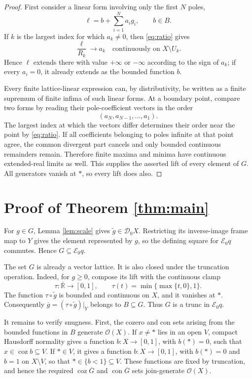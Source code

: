 \documentclass[11pt]{article}
\newcommand{\eR}{\overline{\mathbb{R}}}
\newcommand{\cO}{\mathcal{O}}
\newcommand{\E}{\mathcal{E}}
\newcommand{\D}{\mathcal{D}}
\begin{document}
\begin{proof}
First consider a linear form involving only the first \(N\) poles,
\[
 \ell=b+\sum_{i=1}^N a_i g_i,
 \qquad b\in B.
\]
If \(k\) is the largest index for which \(a_k\neq0\), then
\eqref{eq:ratio} gives
\[
 \frac{\ell}{R_k}\longrightarrow a_k
 \quad\text{continuously on }X\setminus U_k.
\]
Hence \(\ell\) extends there with value \(+\infty\) or \(-\infty\)
according to the sign of \(a_k\); if every \(a_i=0\), it already extends as
the bounded function \(b\).

Every finite lattice-linear expression can, by distributivity, be written as
a finite supremum of finite infima of such linear forms.  At a boundary point,
compare two forms by reading their pole-coefficient vectors in the order
\[
 (a_N,a_{N-1},\ldots,a_1).
\]
The largest index at which the vectors differ determines their order near the
point by \eqref{eq:ratio}.  If all coefficients belonging to poles infinite at
that point agree, the common divergent part cancels and only bounded continuous
remainders remain.  Therefore finite maxima and minima have continuous
extended-real limits as well.  This supplies the asserted lift of every
element of \(G\).  All generators vanish at \(*\), so every lift does also.
\end{proof}

\section{Proof of Theorem \ref{thm:main}}

For \(g\in G\), Lemma \ref{lem:scale} gives
\(\widetilde g\in\D_0X\).  Restricting its inverse-image frame map to \(Y\)
gives the element represented by \(g\), so the defining square for
\(\E_0q\) commutes.  Hence \(G\subseteq\E_0q\).

The set \(G\) is already a vector lattice.  It is also closed under the
truncation operation.  Indeed, for \(g\geq0\), compose its lift with the
continuous clamp
\[
 \tau:\eR\longrightarrow[0,1],
 \qquad \tau(t)=\min\{\max\{t,0\},1\}.
\]
The function \(\tau\circ\widetilde g\) is bounded and continuous on \(X\),
and it vanishes at \(*\).  Consequently
\(\overline g=(\tau\circ\widetilde g)|_Y\) belongs to \(B\subseteq G\).
Thus \(G\) is a trunc in \(\E_0q\).

It remains to verify snugness.  First, the cozero and con sets arising from
the bounded functions in \(B\) generate \(\cO(X)\).  If \(x\neq *\) lies in
an open \(V\), compact Hausdorff normality gives a function
\(b:X\to[0,1]\), with \(b(*)=0\), such that
\(x\in\operatorname{coz}b\subseteq V\).  If \(*\in V\), it gives a
function \(b:X\to[0,1]\), with \(b(*)=0\) and \(b=1\) on \(X\setminus V\),
so that \(*\in\{b<1\}\subseteq V\).  These functions are fixed by
truncation, and hence the required \(\operatorname{coz}\overline G\) and
\(\operatorname{con}\overline G\) sets join-generate \(\cO(X)\).
\end{document}
